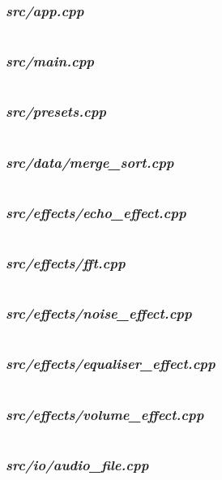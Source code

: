 \subsubsection {\textit{src/app.cpp}}
\inputminted[linenos]{c++}{../src/app.cpp}
\pagebreak
\subsubsection {\textit{src/main.cpp}}
\inputminted[linenos]{c++}{../src/main.cpp}
\pagebreak
\subsubsection {\textit{src/presets.cpp}}
\inputminted[linenos]{c++}{../src/presets.cpp}
\pagebreak
\subsubsection {\textit{src/data/merge\_sort.cpp}}
\inputminted[linenos]{c++}{../src/data/merge_sort.cpp}
\pagebreak
\subsubsection {\textit{src/effects/echo\_effect.cpp}}
\inputminted[linenos]{c++}{../src/effects/echo_effect.cpp}
\pagebreak
\subsubsection {\textit{src/effects/fft.cpp}}
\inputminted[linenos]{c++}{../src/effects/fft.cpp}
\pagebreak
\subsubsection {\textit{src/effects/noise\_effect.cpp}}
\inputminted[linenos]{c++}{../src/effects/noise_effect.cpp}
\pagebreak
\subsubsection {\textit{src/effects/equaliser\_effect.cpp}}
\inputminted[linenos]{c++}{../src/effects/equaliser_effect.cpp}
\pagebreak
\subsubsection {\textit{src/effects/volume\_effect.cpp}}
\inputminted[linenos]{c++}{../src/effects/volume_effect.cpp}
\pagebreak
\subsubsection {\textit{src/io/audio\_file.cpp}}
\inputminted[linenos]{c++}{../src/io/audio_file.cpp}
\pagebreak
